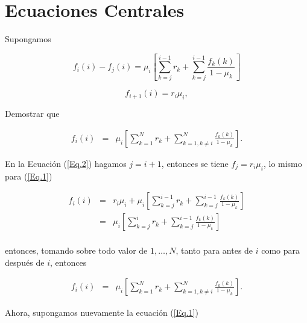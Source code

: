 

\section{Ecuaciones Centrales}



\begin{Prop}
Supongamos

\begin{equation}\label{Eq.1}
f_{i}\left(i\right)-f_{j}\left(i\right)=\mu_{i}\left[\sum_{k=j}^{i-1}r_{k}+\sum_{k=j}^{i-1}\frac{f_{k}\left(k\right)}{1-\mu_{k}}\right]
\end{equation}

\begin{equation}\label{Eq.2}
f_{i+1}\left(i\right)=r_{i}\mu_{i},
\end{equation}

Demostrar que

\begin{eqnarray*}
f_{i}\left(i\right)&=&\mu_{i}\left[\sum_{k=1}^{N}r_{k}+\sum_{k=1,k\neq
i}^{N}\frac{f_{k}\left(k\right)}{1-\mu_{k}}\right].
\end{eqnarray*}


En la Ecuaci\'on (\ref{Eq.2}) hagamos $j=i+1$, entonces se tiene
$f_{j}=r_{i}\mu_{i}$, lo mismo para (\ref{Eq.1})

\begin{eqnarray*}
f_{i}\left(i\right)&=&r_{i}\mu_{i}+\mu_{i}\left[\sum_{k=j}^{i-1}r_{k}+\sum_{k=j}^{i-1}\frac{f_{k}\left(k\right)}{1-\mu_{k}}\right]\\
&=&\mu_{i}\left[\sum_{k=j}^{i}r_{k}+\sum_{k=j}^{i-1}\frac{f_{k}\left(k\right)}{1-\mu_{k}}\right]\\
\end{eqnarray*}

entonces, tomando sobre todo valor de $1,\ldots,N$, tanto para
antes de $i$ como para despu\'es de $i$, entonces

\begin{eqnarray*}
f_{i}\left(i\right)&=&\mu_{i}\left[\sum_{k=1}^{N}r_{k}+\sum_{k=1,k\neq
i}^{N}\frac{f_{k}\left(k\right)}{1-\mu_{k}}\right].
\end{eqnarray*}
\end{Prop}


Ahora, supongamos nuevamente la ecuaci\'on (\ref{Eq.1})

